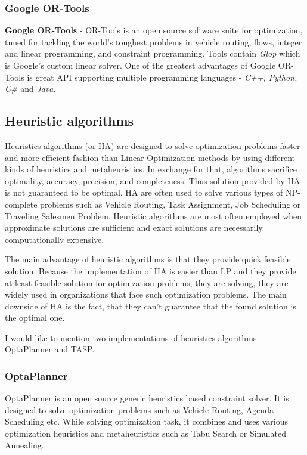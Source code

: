 \subsubsection{Google OR-Tools}
\textbf{Google OR-Tools} - OR-Tools is an open source software suite for optimization,
tuned for tackling the world's toughest problems in vehicle routing, flows,
integer and linear programming, and constraint programming\cite{web:googleOrTools}.
Tools contain \textit{Glop} which is Google's custom linear solver.
One of the greatest advantages of Google OR-Tools is great API supporting multiple programming languages - \textit{C++, Python, C\#} and \textit{Java}.


\subsection{Heuristic algorithms}\label{subsec:heuristic-algorithms}
Heuristics algorithms (or HA) are designed to solve optimization problems faster
and more efficient fashion than Linear Optimization methods by using different kinds of heuristics and metaheuristics.
In exchange for that, algorithms sacrifice optimality, accuracy, precision, and completeness.
Thus solution provided by HA is not guaranteed to be optimal.
HA are often used to solve various types of NP-complete problems such as
Vehicle Routing, Task Assignment, Job Scheduling or Traveling Salesmen Problem.
Heuristic algorithms are most often employed when approximate solutions are sufficient
and exact solutions are necessarily computationally expensive\cite{papanikolaou2018holistic}.

The main advantage of heuristic algorithms is that they provide quick feasible solution.
Because the implementation of HA is easier than LP and they provide at least feasible solution for optimization problems,
they are solving, they are widely used in organizations that face such optimization problems.
The main downside of HA is the fact, that they can't guarantee that the found solution is the optimal one.

\medskip
\noindent I would like to mention two implementations of heuristics algorithms - OptaPlanner and TASP\@.

\subsubsection{OptaPlanner}
OptaPlanner is an open source generic heuristics based constraint solver.
It is designed to solve optimization problems such as Vehicle Routing, Agenda Scheduling etc.
While solving optimization task, it combines and uses various optimization heuristics and metaheuristics such as
Tabu Search or Simulated Annealing.

